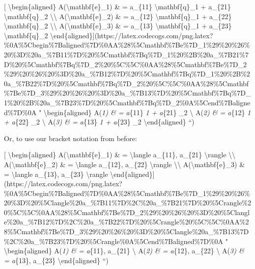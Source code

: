 \documentclass[]{article}
\begin{document}
{[} \textbackslash{}begin\{aligned\} A(\textbackslash{}mathbf\{e\}\_1) \& =
a\_\{11\} \textbackslash{}mathbf\{q\}\_1 + a\_\{21\}
\textbackslash{}mathbf\{q\}\_2 \textbackslash{}\textbackslash{}
A(\textbackslash{}mathbf\{e\}\_2) \& = a\_\{12\} \textbackslash{}mathbf\{q\}\_1
+ a\_\{22\} \textbackslash{}mathbf\{q\}\_2 \textbackslash{}\textbackslash{}
A(\textbackslash{}mathbf\{e\}\_3) \& = a\_\{13\} \textbackslash{}mathbf\{q\}\_1
+ a\_\{23\} \textbackslash{}mathbf\{q\}\_2
\textbackslash{}end\{aligned\}{]}(https://latex.codecogs.com/png.latex?\%0A\%5Cbegin\%7Baligned\%7D\%0AA\%28\%5Cmathbf\%7Be\%7D\_1\%29\%20\%26\%20\%3D\%20a\_\%7B11\%7D\%20\%5Cmathbf\%7Bq\%7D\_1\%20\%2B\%20a\_\%7B21\%7D\%20\%5Cmathbf\%7Bq\%7D\_2\%20\%5C\%5C\%0AA\%28\%5Cmathbf\%7Be\%7D\_2\%29\%20\%26\%20\%3D\%20a\_\%7B12\%7D\%20\%5Cmathbf\%7Bq\%7D\_1\%20\%2B\%20a\_\%7B22\%7D\%20\%5Cmathbf\%7Bq\%7D\_2\%20\%5C\%5C\%0AA\%28\%5Cmathbf\%7Be\%7D\_3\%29\%20\%26\%20\%3D\%20a\_\%7B13\%7D\%20\%5Cmathbf\%7Bq\%7D\_1\%20\%2B\%20a\_\%7B23\%7D\%20\%5Cmathbf\%7Bq\%7D\_2\%0A\%5Cend\%7Baligned\%7D\%0A
" \textbackslash{}begin\{aligned\} A(\emph{1) \& = a}\{11\}
\emph{1 + a}\{21\} \_2 \textbackslash{} A(\emph{2)
\& = a}\{12\} \emph{1 + a}\{22\} \_2 \textbackslash{}
A(\emph{3) \& = a}\{13\} \emph{1 + a}\{23\} \_2
\textbackslash{}end\{aligned\} ``)

Or, to use our bracket notation from before:

{[} \textbackslash{}begin\{aligned\} A(\textbackslash{}mathbf\{e\}\_1) \& =
\textbackslash{}langle a\_\{11\}, a\_\{21\} \textbackslash{}rangle
\textbackslash{}\textbackslash{} A(\textbackslash{}mathbf\{e\}\_2) \& =
\textbackslash{}langle a\_\{12\}, a\_\{22\} \textbackslash{}rangle
\textbackslash{}\textbackslash{} A(\textbackslash{}mathbf\{e\}\_3) \& =
\textbackslash{}langle a\_\{13\}, a\_\{23\} \textbackslash{}rangle
\textbackslash{}end\{aligned\}{]}(https://latex.codecogs.com/png.latex?\%0A\%5Cbegin\%7Baligned\%7D\%0AA\%28\%5Cmathbf\%7Be\%7D\_1\%29\%20\%26\%20\%3D\%20\%5Clangle\%20a\_\%7B11\%7D\%2C\%20a\_\%7B21\%7D\%20\%5Crangle\%20\%5C\%5C\%0AA\%28\%5Cmathbf\%7Be\%7D\_2\%29\%20\%26\%20\%3D\%20\%5Clangle\%20a\_\%7B12\%7D\%2C\%20a\_\%7B22\%7D\%20\%5Crangle\%20\%5C\%5C\%0AA\%28\%5Cmathbf\%7Be\%7D\_3\%29\%20\%26\%20\%3D\%20\%5Clangle\%20a\_\%7B13\%7D\%2C\%20a\_\%7B23\%7D\%20\%5Crangle\%0A\%5Cend\%7Baligned\%7D\%0A
" \textbackslash{}begin\{aligned\} A(\emph{1) \& = \langle a}\{11\},
a\_\{21\} \rangle \textbackslash{} A(\emph{2) \& = \langle a}\{12\},
a\_\{22\} \rangle \textbackslash{} A(\emph{3) \& = \langle a}\{13\},
a\_\{23\} \rangle \textbackslash{}end\{aligned\} ``)
\end{document}
